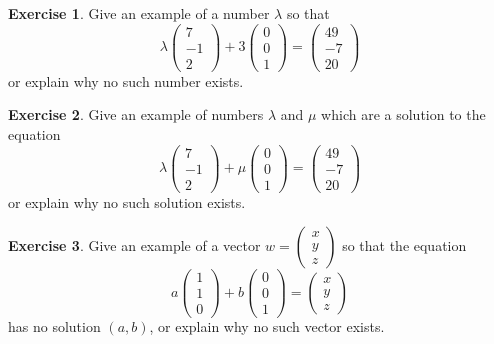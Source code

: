 \documentclass[11pt]{amsart}
\theoremstyle{definition}
\newtheorem{exercise}{Exercise}
\begin{document}
\begin{exercise}
Give an example of a number $\lambda$ so that
\[
\lambda \begin{pmatrix} 7 \\ -1 \\ 2 \end{pmatrix} + 3 \begin{pmatrix} 0 \\ 0 \\ 1 \end{pmatrix} = \begin{pmatrix} 49 \\ -7 \\ 20 \end{pmatrix}
\]
or explain why no such number exists.
\end{exercise}

\begin{exercise}
Give an example of numbers $\lambda$ and $\mu$ which are a solution to the equation
\[
\lambda \begin{pmatrix} 7 \\ -1 \\ 2 \end{pmatrix} + \mu \begin{pmatrix} 0 \\ 0 \\ 1 \end{pmatrix} = \begin{pmatrix} 49 \\ -7 \\ 20 \end{pmatrix}
\]
or explain why no such solution exists.
\end{exercise}

\begin{exercise}
Give an example of a vector $w = \begin{pmatrix} x \\ y \\ z \end{pmatrix}$ so that the equation
\[
a \begin{pmatrix} 1 \\ 1 \\ 0 \end{pmatrix} + b \begin{pmatrix} 0 \\ 0 \\ 1 \end{pmatrix} = \begin{pmatrix} x \\ y \\ z \end{pmatrix}
\]
has no solution $(a,b)$, or explain why no such vector exists.
\end{exercise}
\end{document}
